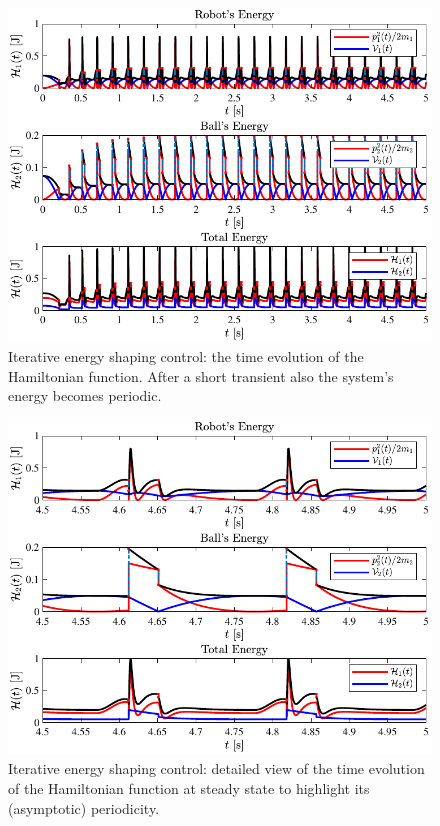 \begin{figure}[!ht]
	\centering
	\includegraphics[width=\linewidth]{Figures/ctrl4.pdf}
	\caption{Iterative energy shaping control: the time evolution of the Hamiltonian function. After a short transient also the system's energy becomes periodic.}
	\label{fig:ctrl4}
\end{figure}
%
\begin{figure}[!ht]
	\centering
	\includegraphics[width=\linewidth]{Figures/ctrl4_det.pdf}
	\caption{Iterative energy shaping control: detailed view of the time evolution of the Hamiltonian function at steady state to highlight its (asymptotic) periodicity.}
	\label{fig:ctrl4_det}
\end{figure}
